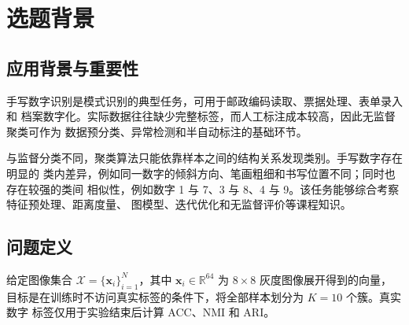 \documentclass[12pt,a4paper,UTF8]{ctexart}
\begin{document}
\cover

\begin{abstract}
手写数字图像具有书写倾斜、类内差异大和类别边界非线性的特点，标准 K-means
的球形簇假设难以充分描述其流形结构。本文提出一种基于图像矩倾斜校正、局部尺度
谱图、模块度重启选择和邻域一致性细化的无监督聚类方法。首先利用二阶图像矩估计
水平剪切量并校正数字倾斜；随后构建自适应局部尺度的 k 近邻图，通过归一化图拉普拉斯
矩阵得到谱嵌入；在谱空间中执行自主实现的 K-means++，并以原始邻域图的模块度而非
欧氏惯性选择重启结果；最后通过邻域多数投票修正局部不一致样本。参数选择与模型训练
均不使用真实类别标签，标签仅用于实验结束后的客观评价。

在 scikit-learn Digits 数据集的 1797 幅图像上，本文方法取得 95.55\% 的聚类
准确率、92.35\% 的归一化互信息和 90.63\% 的调整兰德指数。10 个随机种子下的
平均准确率为 $95.59\%\pm0.02\%$。相较原始 K-means，准确率提高 16.36 个百分点；
消融实验表明各改进模块均产生正向贡献。

\textbf{关键词：}手写数字聚类；谱聚类；K-means++；局部尺度；模块度；DBSCAN
\end{abstract}

\newpage
\tableofcontents
\newpage

\section{选题背景}

\subsection{应用背景与重要性}

手写数字识别是模式识别的典型任务，可用于邮政编码读取、票据处理、表单录入和
档案数字化。实际数据往往缺少完整标签，而人工标注成本较高，因此无监督聚类可作为
数据预分类、异常检测和半自动标注的基础环节。

与监督分类不同，聚类算法只能依靠样本之间的结构关系发现类别。手写数字存在明显的
类内差异，例如同一数字的倾斜方向、笔画粗细和书写位置不同；同时也存在较强的类间
相似性，例如数字 1 与 7、3 与 8、4 与 9。该任务能够综合考察特征预处理、距离度量、
图模型、迭代优化和无监督评价等课程知识。

\subsection{问题定义}

给定图像集合 $\mathcal{X}=\{\boldsymbol{x}_i\}_{i=1}^{N}$，其中
$\boldsymbol{x}_i\in\mathbb{R}^{64}$ 为 $8\times8$ 灰度图像展开得到的向量，
目标是在训练时不访问真实标签的条件下，将全部样本划分为 $K=10$ 个簇。真实数字
标签仅用于实验结束后计算 ACC、NMI 和 ARI。
\end{document}
